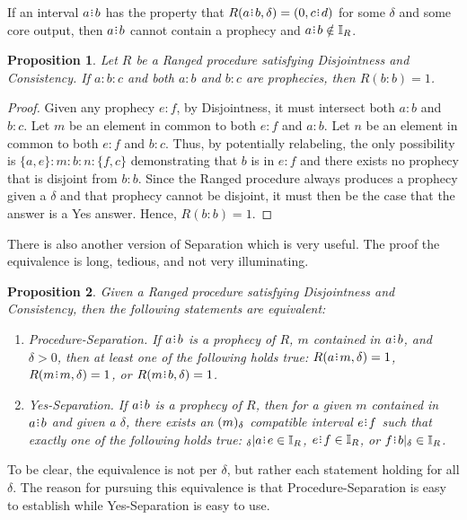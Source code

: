 \documentclass[12pt]{article}
\newtheorem{proposition}{Proposition}[section]
\begin{document}
If an interval $a\rint b$ has the property that $R(a\rint b, \delta) = (0, c\rint d)$ for some $\delta$ and some core output, then $a\rint b$ cannot contain a prophecy and $a\rint b \notin \mathbb{I}_R$. 

\begin{proposition}
    Let $R$ be a Ranged procedure satisfying Disjointness and Consistency. If $a:b:c$ and both $a:b$ and $b:c$ are prophecies, then $R(b:b)=1$.
\end{proposition}

\begin{proof}
   Given any prophecy $e:f$, by Disjointness, it must intersect both $a:b$ and $b:c$. Let $m$ be an element in common to both $e:f$ and $a:b$. Let $n$ be an element in common to both $e:f$ and $b:c$. Thus, by potentially relabeling, the only possibility is $\{a, e\}:m:b:n:\{f, c\}$ demonstrating that $b$ is in $e:f$ and there exists no prophecy that is disjoint from $b:b$. Since the Ranged procedure always produces a prophecy given a $\delta$ and that prophecy cannot be disjoint, it must then be the case that the answer is a Yes answer. Hence, $R(b:b)=1$. 
\end{proof}


There is also another version of Separation which is very useful. The proof the equivalence is long, tedious, and not very illuminating. 

\begin{proposition}
    Given a Ranged procedure satisfying Disjointness and Consistency, then the following statements are equivalent: 
    \begin{enumerate}
        \item Procedure-Separation. If $a\rint b$ is a prophecy of $R$, $m$ contained in $a\rint b$, and $\delta > 0$, then at least one of the following holds true: $R(a \rint m, \delta) =1$, $R(m \rint m, \delta) = 1$, or $R(m \rint b, \delta) = 1$.
        \item Yes-Separation. If $a\rint b$ is a prophecy of $R$, then for a given $m$ contained in $a\rint b$ and given a $\delta$, there exists an $(m)_{\delta}$ compatible interval $e\rint f$ such that exactly one of the following holds true:   ${}_\delta |a\rint e \in \mathbb{I}_R$, $e\rint f \in \mathbb{I}_R$,  or $f\rint b|_\delta \in \mathbb{I}_R$.
    \end{enumerate}
\end{proposition}

To be clear, the equivalence is not per $\delta$, but rather each statement holding for all $\delta$. The reason for pursuing this equivalence is that Procedure-Separation is easy to establish while Yes-Separation is easy to use. 
\end{document}
